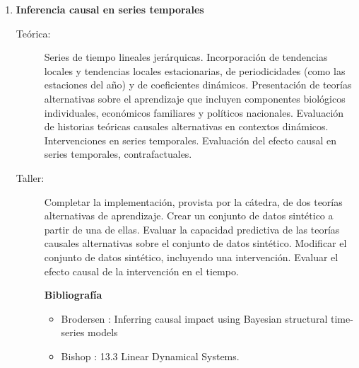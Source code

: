 \documentclass[10pt]{article}
\begin{document}
\begin{enumerate}
\item \textbf{Inferencia causal en series temporales}
\vspace{-0.15cm}
\begin{description}
\item[Teórica:]
Series de tiempo lineales jerárquicas.
Incorporación de tendencias locales y tendencias locales estacionarias, de periodicidades (como las estaciones del año) y de coeficientes dinámicos.
Presentación de teorías alternativas sobre el aprendizaje que incluyen componentes biológicos individuales, económicos familiares y políticos nacionales.
Evaluación de historias teóricas causales alternativas en contextos dinámicos.
Intervenciones en series temporales.
Evaluación del efecto causal en series temporales, contrafactuales.
\item[Taller:]
Completar la implementación, provista por la cátedra, de dos teorías alternativas de aprendizaje.
Crear un conjunto de datos sintético a partir de una de ellas.
Evaluar la capacidad predictiva de las teorías causales alternativas sobre el conjunto de datos sintético.
Modificar el conjunto de datos sintético, incluyendo una intervención.
Evaluar el efecto causal de la intervención en el tiempo.
\item[] \textbf{Bibliografía}
\begin{itemize}
\item Brodersen \cite{brodersen2015-causalTimeSeries}: Inferring causal impact using Bayesian structural time-series models
\item Bishop \cite{bishop2006-PRML}: 13.3 Linear Dynamical Systems.
\end{itemize}
\end{description}


\end{enumerate}
\end{document}
